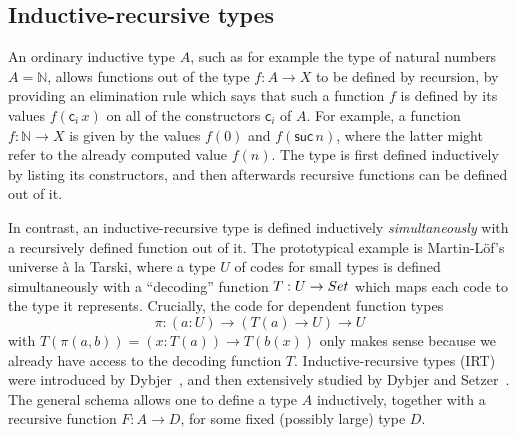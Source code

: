 \documentclass[a4paper,UKenglish,numberwithinsect,cleveref,thm-restate]{lipics-v2021}
\newcommand{\LT}[2][]{\todo[inline,author={L-T},caption={},color={pink},#1]{#2}}
\begin{document}
%

\subsection{Inductive-recursive types}

An ordinary inductive type $A$, such as for example the type of natural numbers $A = \mathbb{N}$, allows functions out of the type $f : A \to X$ to be defined by recursion, by providing an elimination rule which says that such a function $f$ is defined by its values $f(\mathsf{c}_i\,x)$ on all of the constructors $\mathsf{c}_i$ of $A$. For example, a function $f: \mathbb{N} \to X$ is given by the values $f(0)$ and $f(\mathsf{suc}\,n)$, where the latter might refer to the already computed value $f(n)$.
%
The type is first defined inductively by listing its constructors, and then afterwards recursive functions can be defined out of it.

In contrast, an inductive-recursive type is defined inductively \emph{simultaneously} with a recursively defined function out of it. The prototypical example is Martin-L\"of's universe \`a la Tarski, where a type $U$ of codes for small types is defined simultaneously with a ``decoding'' function $T : U \to \Set$ which maps each code to the type it represents. Crucially, the code for dependent function types
\[
  \pi : (a : U) \to (T(a) \to U) \to U
\]
with $T(\pi(a, b)) = (x : T(a)) \to T(b(x))$ only makes sense because we already have access to the decoding function $T$.
%
Inductive-recursive types (IRT) were introduced by Dybjer~\cite{Dybjer2000}, and then extensively studied by Dybjer and Setzer~\cite{Dybjer1999,Dybjer2003}.
The general schema allows one to define a type $A$ inductively, together with a recursive function $F : A \to D$, for some fixed (possibly large) type $D$.
\end{document}
